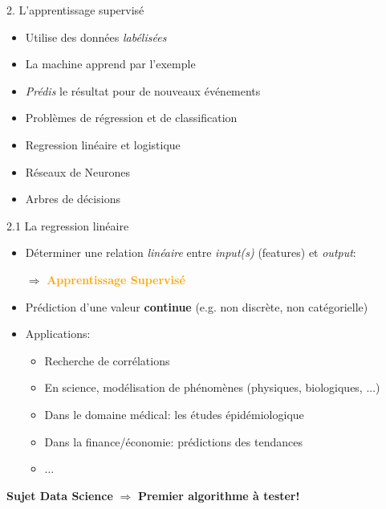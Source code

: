 \begin{frame}{2. L'apprentissage supervisé}
  \begin{itemize}
  \item Utilise des données \textit{labélisées}
  \item La machine apprend par l'exemple
  \item \textit{Prédis} le résultat pour de nouveaux événements
  \item Problèmes de régression et de classification
  \item Regression linéaire et logistique
  \item Réseaux de Neurones
  \item Arbres de décisions
  \end{itemize}
\end{frame}

\begin{frame}{2.1 La regression linéaire}
  \begin{itemize}
    
  \item Déterminer une relation \textit{linéaire} entre \textit{input(s)} (features) et \textit{output}:
    \begin{center}
      \normalsize
      \boldmath $\Rightarrow$ \unboldmath \textbf{\textcolor{orange}{Apprentissage Supervisé}}
    \end{center}
  \item Prédiction d'une valeur \textbf{continue} (e.g. non discrète, non catégorielle)
  \item Applications:
    \begin{itemize}
      \normalsize
    \item Recherche de corrélations
    \item En science, modélisation de phénomènes (physiques, biologiques, ...)
    \item Dans le domaine médical: les études épidémiologique
    \item Dans la finance/économie: prédictions des tendances
    \item $\dots$
    \end{itemize}
  \end{itemize}
  \begin{center}
    \textbf{Sujet Data Science} \boldmath $\Rightarrow$ \unboldmath \textbf{Premier algorithme à tester!}
  \end{center}
\end{frame}

